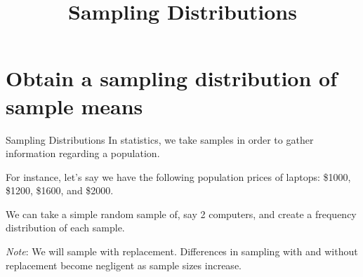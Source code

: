 \documentclass[t]{beamer}
\title{Sampling Distributions}
\author{}
\date{}
\begin{document}

\begin{frame} 
\maketitle
\end{frame}

\section{Obtain a sampling distribution of sample means}

\begin{frame}{Sampling Distributions}
In statistics, we take samples in order to gather information regarding a population. \newline\\	\pause

For instance, let's say we have the following population prices of laptops: \$1000, \$1200, \$1600, and \$2000.	\newline\\	\pause

We can take a simple random sample of, say 2 computers, and create a frequency distribution of each sample.	\newline\\	\pause

\emph{Note}: We will sample with replacement. Differences in sampling with and without replacement become negligent as sample sizes increase.
\end{frame}
\end{document}
